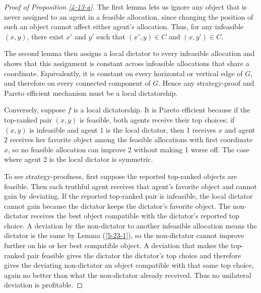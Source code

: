 \propositionproofstyle
\begin{proof}[Proof of Proposition \ref{4-13-a}]
	The first lemma lets us ignore any object that is never assigned to an agent in a feasible allocation, since changing the position of such an object cannot affect either agent's allocation.
	Thus, for any infeasible $(x,y)$, there exist $x'$ and $y'$ such that $(x',y) \in C$ and $(x,y') \in C$.

	The second lemma then assigns a local dictator to every infeasible allocation and shows that this assignment is constant across infeasible allocations that share a coordinate. Equivalently, it is constant on every horizontal or vertical edge of $G$, and therefore on every connected component of $G$.
	Hence any strategy-proof and Pareto efficient mechanism must be a local dictatorship.

	Conversely, suppose $f$ is a local dictatorship.
	It is Pareto efficient because if the top-ranked pair $(x,y)$ is feasible, both agents receive their top choices; if $(x,y)$ is infeasible and agent 1 is the local dictator, then 1 receives $x$ and agent 2 receives her favorite object among the feasible allocations with first coordinate $x$, so no feasible allocation can improve 2 without making 1 worse off. The case where agent 2 is the local dictator is symmetric.

	To see strategy-proofness, first suppose the reported top-ranked objects are feasible. Then each truthful agent receives that agent's favorite object and cannot gain by deviating. If the reported top-ranked pair is infeasible, the local dictator cannot gain because the dictator keeps the dictator's favorite object. The non-dictator receives the best object compatible with the dictator's reported top choice. 
	A deviation by the non-dictator to another infeasible allocation means the dictator is the same by Lemma (\ref{5-23-1}), so the non-dictator cannot improve further on his or her best compatible object. 
	A deviation that makes the top-ranked pair feasible gives the dictator the dictator's top choice and therefore gives the deviating non-dictator an object compatible with that same top choice, again no better than what the non-dictator already received. Thus no unilateral deviation is profitable.
\end{proof}
